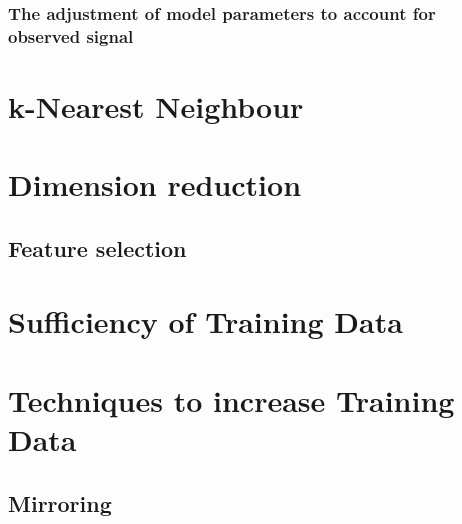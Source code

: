 \subsubsection{The adjustment of model parameters to account for observed signal}
\section{k-Nearest Neighbour}
\section{Dimension reduction}
\subsection{Feature selection}
\section{Sufficiency of Training Data}
\section{Techniques to increase Training Data}
\subsection{Mirroring}